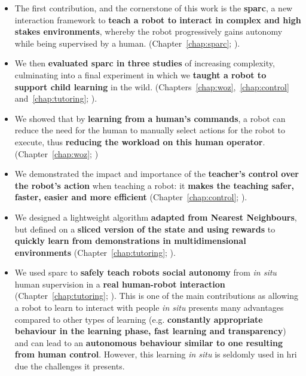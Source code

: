 \begin{itemize}
	\item The first contribution, and the cornerstone of this work is the \textbf{\acrfull{sparc}}, a new interaction framework to \textbf{teach a robot to interact in complex and high stakes environments}, whereby the robot progressively gains autonomy while being supervised by a human. (Chapter~\ref{chap:sparc}; \citealt{senft2015human,senft2015sparc}).
	
	\item We then \textbf{evaluated \gls{sparc} in three studies} of increasing complexity, culminating into a final experiment in which we \textbf{taught a robot to support child learning} in the wild. (Chapters~\ref{chap:woz},~\ref{chap:control} and~\ref{chap:tutoring}; \citealt{senft2015sparc,senft2017supervised,senft2018robots}).
	
	\item We showed that by \textbf{learning from a human's commands}, a robot can reduce the need for the human to manually select actions for the robot to execute, thus \textbf{reducing the workload on this human operator}. (Chapter~\ref{chap:woz}; \citealt{senft2015sparc})	
	
	\item We demonstrated the impact and importance of the \textbf{teacher's control over the robot's action} when teaching a robot: it \textbf{makes the teaching safer, faster, easier and more efficient} (Chapter~\ref{chap:control}; \citealt{senft2016sparc,senft2017supervised}).
	
	\item We designed a lightweight algorithm \textbf{adapted from Nearest Neighbours}, but defined on a \textbf{sliced version of the state and using rewards} to \textbf{quickly learn from demonstrations in multidimensional environments} (Chapter~\ref{chap:tutoring}; \citealt{senft2017toward}).
	
	\item We used \gls{sparc} to \textbf{safely teach robots social autonomy}  from \textit{in situ} human supervision in a \textbf{real human-robot interaction} (Chapter~\ref{chap:tutoring}; \citealt{senft2018robots}). This is one of the main contributions as allowing a robot to learn to interact with people \textit{in situ} presents many advantages compared to other types of learning (e.g. \textbf{constantly appropriate behaviour in the learning phase, fast learning and transparency}) and can lead to an \textbf{autonomous behaviour similar to one resulting from human control}. However, this learning \emph{in situ} is seldomly used in \gls{hri} due the challenges it presents.
\end{itemize}


